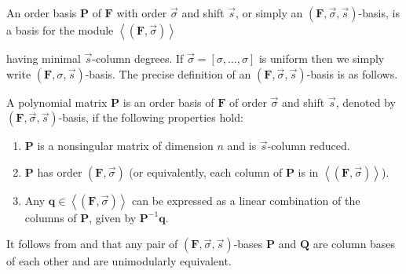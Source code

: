 An order basis \citep{BeLa94,BL1997} $\mathbf{P}$ of $\mathbf{F}$
with order $\vec{\sigma}$ and shift $\vec{s}$, or simply an $\left(\mathbf{F},\vec{\sigma},\vec{s}\right)$-basis,
is a basis for the module $\left\langle \left(\mathbf{F},\vec{\sigma}\right)\right\rangle $
\begin{comment}
\[
\left\langle \left(\mathbf{F},\vec{\sigma}\right)\right\rangle =\{\mathbf{p}\in\mathbb{K}\left[x\right]^{n\times1}\|\mathbf{F}\cdot\mathbf{p}=x^{\vec{\sigma}}\mathbf{r},\mathbf{r}\in\mathbb{K}[[x]]^{m\times1}\}
\]
\end{comment}
{} having minimal $\vec{s}$-column degrees. If $\vec{\sigma}=\left[\sigma,\dots,\sigma\right]$
is uniform then we simply write $\left(\mathbf{F},\sigma,\vec{s}\right)$-basis.
The precise definition of an $\left(\mathbf{F},\vec{\sigma},\vec{s}\right)$-basis
is as follows.
\begin{defn}
\label{def:orderBasis}A polynomial matrix $\mathbf{P}$ is an order
basis of $\mathbf{F}$ of order $\vec{\sigma}$ and shift $\vec{s}$,
denoted by $\left(\mathbf{F},\vec{\sigma},\vec{s}\right)$-basis,
if the following properties hold: 
\begin{enumerate}
\item $\mathbf{P}$ is a nonsingular matrix of dimension $n$ and is $\vec{s}$-column
reduced. 
\item $\mathbf{P}$ has order $\left(\mathbf{F},\vec{\sigma}\right)$ (or
equivalently, each column of $\mathbf{P}$ is in $\left\langle (\mathbf{F},\vec{\sigma})\right\rangle $). 
\item Any $\mathbf{q}\in\left\langle \left(\mathbf{F},\vec{\sigma}\right)\right\rangle $
can be expressed as a linear combination of the columns of $\mathbf{P}$,
given by $\mathbf{P}^{-1}\mathbf{q}$. 
\end{enumerate}
\end{defn}
\begin{comment}
Note that the module $\left\langle \left(\mathbf{F},\vec{\sigma}\right)\right\rangle $
does not depend on the shift $\vec{s}$. 
\end{comment}




It follows from  and 
that any pair of $\left(\mathbf{F},\vec{\sigma},\vec{s}\right)$-bases
$\mathbf{P}$ and $\mathbf{Q}$ are column bases of each other and
are unimodularly equivalent.

